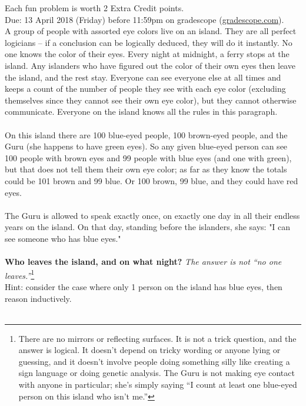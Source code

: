 \documentclass{article}
\theoremstyle{definition}
\begin{document}
\noindent
Each fun problem is worth 2 Extra Credit points.\\
Due: 13 April 2018 (Friday) before 11:59pm on gradescope (\url{gradescope.com}).\\

\noindent
A group of people with assorted eye colors live on an island. They are all perfect logicians -- if a conclusion can be logically deduced, they will do it instantly. No one knows the color of their eyes. Every night at midnight, a ferry stops at the island. Any islanders who have figured out the color of their own eyes then leave the island, and the rest stay. Everyone can see everyone else at all times and keeps a count of the number of people they see with each eye color (excluding themselves since they cannot see their own eye color), but they cannot otherwise communicate. Everyone on the island knows all the rules in this paragraph.\\
\\
On this island there are 100 blue-eyed people, 100 brown-eyed people, and the Guru (she happens to have green eyes). So any given blue-eyed person can see 100 people with brown eyes and 99 people with blue eyes (and one with green), but that does not tell them their own eye color; as far as they know the totals could be 101 brown and 99 blue. Or 100 brown, 99 blue, and they could have red eyes.\\
\\
The Guru is allowed to speak exactly once, on exactly one day in all their endless years on the island. On that day, standing before the islanders, she says: "I can see someone who has blue eyes."\\
\\
\textbf{Who leaves the island, and on what night?} \textit{The answer is not ``no one leaves.''}\footnote{There are no mirrors or reflecting surfaces. It is not a trick question, and the answer is logical. It doesn't depend on tricky wording or anyone lying or guessing, and it doesn't involve people doing something silly like creating a sign language or doing genetic analysis. The Guru is not making eye contact with anyone in particular; she's simply saying ``I count at least one blue-eyed person on this island who isn't me.''}\\
Hint: consider the case where only 1 person on the island has blue eyes, then reason inductively.\ \\
\ \\
\end{document}
